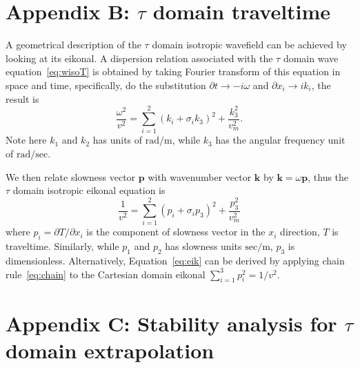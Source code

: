 \appendix
\section{Appendix B: $\tau$ domain traveltime}

A geometrical description of the $\tau$ domain isotropic wavefield can be achieved by looking at its eikonal. A dispersion relation associated with the $\tau$ domain wave equation~\ref{eq:wisoT} is obtained by taking Fourier transform of this equation in space and time, specifically, do the substitution $\partial t \rightarrow -i\omega$ and $\partial x_i \rightarrow i k_i$, the result is
\begin{equation}
\label{eq:wk}
\frac{\omega^2}{v^2} = \sum_{i=1}^2 \left(k_i + \sigma_i k_3\right)^2 + \frac{k_3^2}{v_m^2} .
\end{equation}
Note here $k_1$ and $k_2$ has units of $\mathrm{rad/m}$, while $k_3$ has the angular frequency unit of $\mathrm{rad/sec}$.

We then relate slowness vector $\mathbf{p}$ with wavenumber vector $\mathbf{k}$ by $\mathbf{k} = \omega \mathbf{p}$, thus the $\tau$ domain isotropic eikonal equation is
\begin{equation}
\label{eq:eik}
\frac{1}{v^2} = \sum_{i=1}^2 \left(p_i + \sigma_i p_3\right)^2 + \frac{p_3^2}{v_m^2}
\end{equation}
where $p_i = \partial T / \partial x_i$ is the component of slowness vector in the $x_i$ direction, $T$ is traveltime.
Similarly, while $p_1$ and $p_2$ has slowness units $\mathrm{sec/m}$, $p_3$ is dimensionless.
Alternatively, Equation~\ref{eq:eik} can be derived by applying chain rule~\ref{eq:chain} to the Cartesian domain eikonal $\sum_{i=1}^3 p_i^2 = 1/v^2$.

\appendix
\section{Appendix C: Stability analysis for $\tau$ domain extrapolation}

